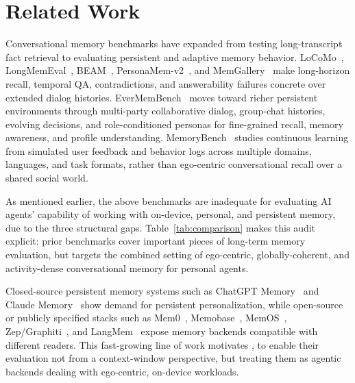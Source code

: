 \section{Related Work \texorpdfstring{\cred{[1.0 pages]}}{[1.0 pages]}}
\label{sec:related}
Conversational memory benchmarks have expanded from testing long-transcript fact retrieval to evaluating persistent and adaptive memory behavior.
LoCoMo~\citep{maharana2024evaluating}, LongMemEval~\citep{wu2025longmemeval}, BEAM~\citep{tavakoli2025beam}, PersonaMem-v2~\citep{jiang2025personamemv2}, and MemGallery~\citep{bei2026memgallery} make long-horizon recall, temporal QA, contradictions, and answerability failures concrete over extended dialog histories. EverMemBench~\citep{hu2026evermembench} moves toward richer persistent environments through multi-party collaborative dialog, group-chat histories, evolving decisions, and role-conditioned personas for fine-grained recall, memory awareness, and profile understanding. MemoryBench~\citep{memorybench2025} studies continuous learning from simulated user feedback and behavior logs across multiple domains, languages, and task formats, rather than ego-centric conversational recall over a shared social world.

As mentioned earlier, the above benchmarks are inadequate for evaluating AI agents' capability of working with on-device, personal, and persistent memory, due to the three structural gaps.
Table~\ref{tab:comparison} makes this audit explicit: prior benchmarks cover important pieces of long-term memory evaluation, but \benchmark targets the combined setting of ego-centric, globally-coherent, and activity-dense conversational memory for personal agents.



Closed-source persistent memory systems such as ChatGPT Memory~\citep{openai2024chatgptmemory} and Claude Memory~\citep{anthropic2025claudememory} show demand for persistent personalization, while open-source or publicly specified stacks such as Mem0~\citep{mem0_2024}, Memobase~\citep{memobase2025}, MemOS~\citep{memos2025}, Zep/Graphiti~\citep{rasmussen2025zep,zep2025graphiti}, and LangMem~\citep{langchain2025langmem} expose memory backends compatible with different readers. 
This fast-growing line of work motivates \benchmark, to enable their evaluation not from a context-window perspective, but treating them as agentic backends dealing with ego-centric, on-device workloads.

